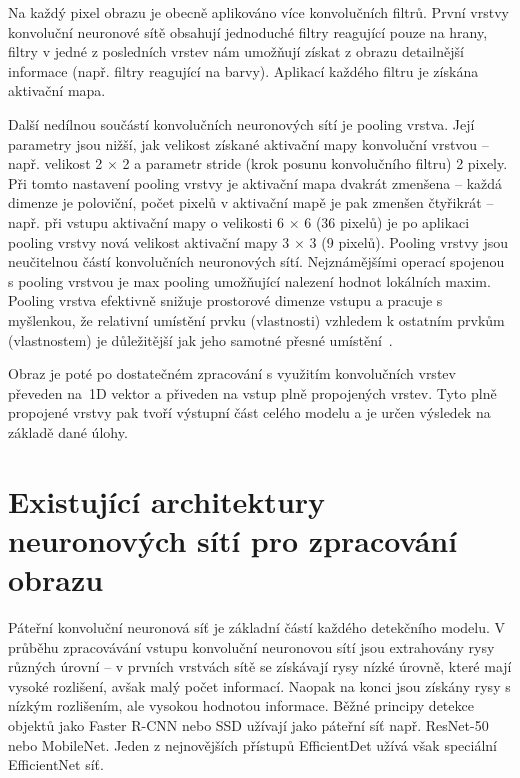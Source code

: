 Na každý pixel obrazu je obecně aplikováno více konvolučních filtrů. První vrstvy konvoluční neuronové sítě obsahují jednoduché filtry reagující pouze na hrany, filtry v jedné z posledních vrstev nám umožňují získat z obrazu detailnější informace (např. filtry reagující na barvy). Aplikací každého filtru je získána aktivační mapa. 

Další nedílnou součástí konvolučních neuronových sítí je pooling vrstva. Její parametry jsou nižší, jak velikost získané aktivační mapy konvoluční vrstvou -- např. velikost 2 $\times$ 2 a parametr stride (krok posunu konvolučního filtru) 2 pixely. Při tomto nastavení pooling vrstvy je aktivační mapa dvakrát zmenšena -- každá dimenze je poloviční, počet pixelů v aktivační mapě je pak zmenšen čtyřikrát -- např. při vstupu aktivační mapy o velikosti 6 $\times$ 6 (36 pixelů) je po aplikaci pooling vrstvy nová velikost aktivační mapy 3 $\times$ 3 (9 pixelů). Pooling vrstvy jsou neučitelnou částí konvolučních neuronových sítí. Nejznámějšími operací spojenou s pooling vrstvou je max pooling umožňující nalezení hodnot lokálních maxim. Pooling vrstva efektivně snižuje prostorové dimenze vstupu a pracuje s myšlenkou, že relativní umístění prvku (vlastnosti) vzhledem k ostatním prvkům (vlastnostem) je důležitější jak jeho samotné přesné umístění~\cite{PoolingLayers}.

Obraz je poté po dostatečném zpracování s využitím konvolučních vrstev převeden na~1D vektor a přiveden na vstup plně propojených vrstev. Tyto plně propojené vrstvy pak tvoří výstupní část celého modelu a je určen výsledek na základě dané úlohy.

\section{Existující architektury neuronových sítí pro zpracování obrazu}
Páteřní konvoluční neuronová síť je základní částí každého detekčního modelu. V průběhu zpracovávání vstupu konvoluční neuronovou sítí jsou extrahovány rysy různých úrovní -- v prvních vrstvách sítě se získávají rysy nízké úrovně, které mají vysoké rozlišení, avšak malý počet informací. Naopak na konci jsou získány rysy s nízkým rozlišením, ale vysokou hodnotou informace. Běžné principy detekce objektů jako Faster R-CNN nebo SSD užívají jako páteřní síť např. ResNet-50 nebo MobileNet. Jeden z nejnovějších přístupů EfficientDet užívá však speciální EfficientNet síť.
